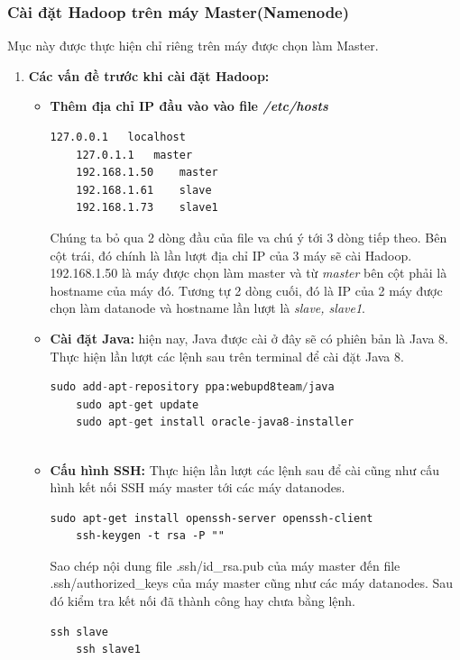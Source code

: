 	\subsubsection{Cài đặt Hadoop trên máy Master(Namenode)}
	Mục này được thực hiện chỉ riêng trên máy được chọn làm Master.
		\begin{enumerate}
			\item \textbf{Các vấn đề trước khi cài đặt Hadoop:}
			\begin{itemize}
			
				\item \textbf{Thêm địa chỉ IP đầu vào vào file \textit{/etc/hosts}}				
				\begin{lstlisting}[caption=Nội dung file /etc/hosts]
	127.0.0.1	localhost
	127.0.1.1	master
	192.168.1.50	master
	192.168.1.61	slave
	192.168.1.73	slave1

				\end{lstlisting}
				Chúng ta bỏ qua 2 dòng đầu của file va chú ý tới 3 dòng tiếp theo. Bên cột trái, đó chính là lần lượt địa chỉ IP của 3 máy sẽ cài Hadoop. 192.168.1.50 là máy được chọn làm master và từ \textit{master} bên cột phải là hostname của máy đó. Tương tự 2 dòng cuối, đó là IP của 2 máy được chọn làm datanode và hostname lần lượt là \textit{slave, slave1}.\par 
				\item \textbf{Cài đặt Java:} hiện nay, Java được cài ở đây sẽ có phiên bản là Java 8. Thực hiện lần lượt các lệnh sau trên terminal để cài đặt Java 8.
				
				\begin{lstlisting}[language=python,caption=Cài đặt Java 8]
	sudo add-apt-repository ppa:webupd8team/java	
	sudo apt-get update	
	sudo apt-get install oracle-java8-installer
	
				\end{lstlisting}
				
				\item \textbf{Cấu hình SSH: } Thực hiện lần lượt các lệnh sau để cài cũng như cấu hình kết nối SSH máy master tới các máy datanodes.
				
				\begin{lstlisting}[caption=Cài đặt SSH]
	sudo apt-get install openssh-server openssh-client	
	ssh-keygen -t rsa -P ""	
				\end{lstlisting}
				Sao chép nội dung file .ssh/id\_rsa.pub của máy master đến file .ssh/authorized\_keys của máy master cũng như các máy datanodes. Sau đó kiểm tra kết nối đã thành công hay chưa bằng lệnh.\par
				\begin{lstlisting}[caption=Kết nối SSH]
	ssh slave
	ssh slave1
				\end{lstlisting}
				

\end{itemize}
\end{enumerate}
